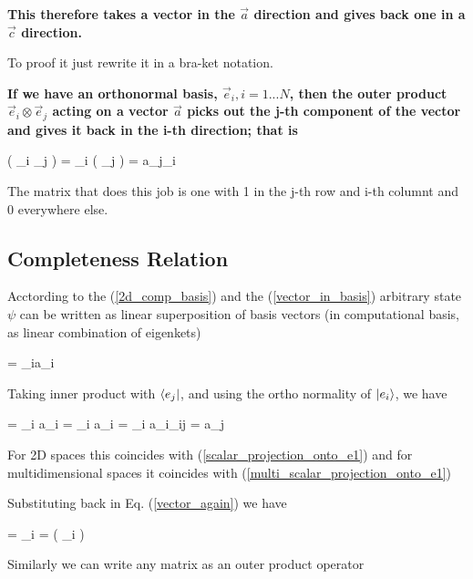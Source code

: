\documentclass{article}
\begin{document}
\textbf{This therefore takes a vector in the $\vec{a}$ direction and gives back one in a $\vec{c}$ direction.}

To proof it just rewrite it in a bra-ket notation.


\textbf{If we have an orthonormal basis, $\vec{e}_{i}, i=1...N$, then the outer product
$\vec{e}_{i} \otimes \vec{e}_{j}$ acting on a vector $\vec{a}$ picks out the j-th component of the vector and gives it back in the i-th direction; that is}

\beq \label{outer_product_basis}
\left( _{i} \otimes {}_{j} \right)  =
_{i} \left( _{j} \cdot {} \right) = a_{j}_{i}
\eeq

The matrix that does this job is one with 1 in the j-th row and i-th columnt and 0 everywhere else.

\subsection{Completeness Relation}

Acctording to the (\ref{2d_comp_basis}) and the (\ref{vector_in_basis}) arbitrary state $\psi$
can be written as linear superposition of basis vectors (in computational basis, as linear combination of eigenkets)

\beq \label{vector_again}
\ket{\psi} = \sum_{i}a_{i}
\eeq

Taking inner product with $\bra{e_{j}}$, and using the ortho normality of $\ket{e_{i}}$, we have


\beq \label{multi_scalar_projection_onto_e1_again}
\ket{\psi} = \sum_{i}  a_{i}  =
\sum_{i} a_{i}  =
\sum_{i} a_{i}\delta_{ij} = a_{j}
\eeq

For 2D spaces this coincides with (\ref{scalar_projection_onto_e1}) and for multidimensional spaces it coincides with (\ref{multi_scalar_projection_onto_e1})

Substituting back in Eq. (\ref{vector_again}) we have

\beq \label{vector_by_outer_product}
\ket{\psi} = 
\sum_{i}  \ket{\psi}  = 
\left( \sum_{i}   \right) \ket{\psi}
\eeq




Similarly we can write any matrix as an outer product operator
\end{document}
